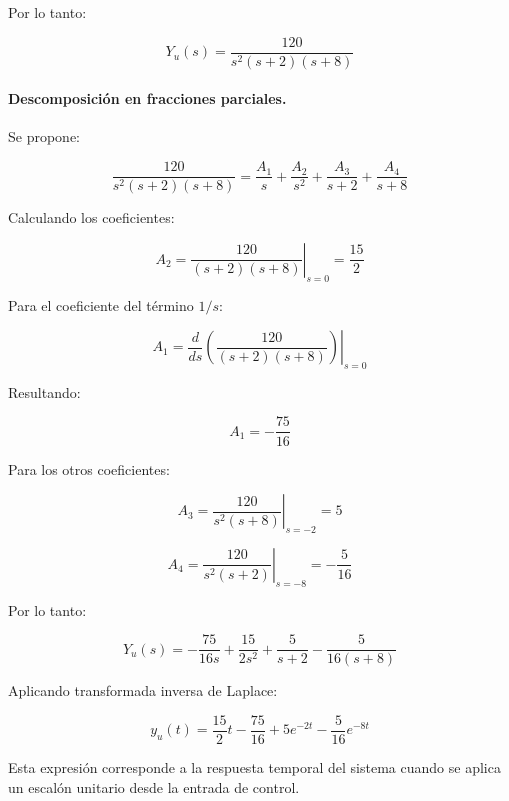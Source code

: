 \documentclass[12pt,a4paper]{article}
\begin{document}
Por lo tanto:

\begin{equation}\boxed{Y_u(s)=\frac{120}{s^2(s+2)(s+8)}}\end{equation}
\paragraph{Descomposición en fracciones parciales.} Se propone:

\begin{equation}\frac{120}{s^2(s+2)(s+8)}=\frac{A_1}{s}+\frac{A_2}{s^2}+\frac{A_3}{s+2}+\frac{A_4}{s+8}\end{equation}

Calculando los coeficientes:

\begin{equation}A_2=\left. \frac{120}{(s+2)(s+8)} \right|_{s=0}=\frac{15}{2}\end{equation}

Para el coeficiente del término $1/s$:

\begin{equation}A_1=\left. \frac{d}{ds} \left( \frac{120}{(s+2)(s+8)} \right) \right|_{s=0}\end{equation}

Resultando:

\begin{equation}A_1=-\frac{75}{16}\end{equation}

Para los otros coeficientes:

\begin{equation}A_3=\left. \frac{120}{s^2(s+8)} \right|_{s=-2}=5\end{equation}

\begin{equation}A_4=\left. \frac{120}{s^2(s+2)} \right|_{s=-8}=-\frac{5}{16}\end{equation}

Por lo tanto:

\begin{equation}Y_u(s)=-\frac{75}{16s}+\frac{15}{2s^2}+\frac{5}{s+2}-\frac{5}{16(s+8)}\end{equation}

Aplicando transformada inversa de Laplace:

\begin{equation}\boxed{y_u(t)=\frac{15}{2}t-\frac{75}{16}+5e^{-2t}-\frac{5}{16}e^{-8t}}\end{equation}

Esta expresión corresponde a la respuesta temporal del sistema cuando se aplica un escalón unitario desde la entrada de control.
\end{document}
